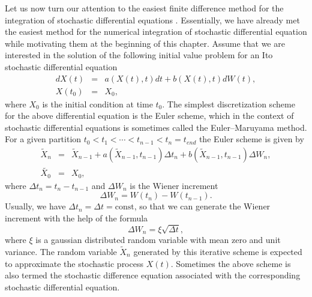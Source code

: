 Let us now turn our attention to the easiest finite difference 
method for the integration of stochastic differential equations
\cite{HONERKAMP,KLOEDEN_NUM,OETTINGER}.
Essentially, we have already met the easiest method for the 
numerical integration of stochastic differential equation while 
motivating them at the beginning of this chapter.
Assume that we are interested in the solution of the following
initial value problem for an Ito stochastic differential equation
\begin{eqnarray*}
dX(t) &=& a(X(t),t) dt + b(X(t),t) dW(t), \\
X(t_0) &=& X_0,
\end{eqnarray*}
where $X_0$ is the initial condition at time $t_0$. The simplest 
discretization scheme for the above differential equation
is the Euler scheme, which in the context of stochastic 
differential equations is sometimes called the Euler--Maruyama
method. For a given partition 
$t_0 < t_1 < \cdots < t_{n-1} < t_n=t_{end}$ 
the Euler scheme is given by
\begin{eqnarray*}
\tilde{X}_n &=& \tilde{X}_{n-1} +a (\tilde{X}_{n-1},t_{n-1}) \Delta 
t_n + b(\tilde{X}_{n-1},t_{n-1}) \Delta W_n, \\
\tilde{X_0} &=& X_0,
\end{eqnarray*}
where $\Delta t_n = t_n - t_{n-1}$ and $\Delta W_n$
is the Wiener increment
\begin{equation*}
\Delta W_n = W(t_n) - W(t_{n-1}).
\end{equation*}
Usually, we have $\Delta t_n = \Delta t = \text{const}$, so that
we can generate the Wiener increment with the help of the formula
\begin{equation*}
\Delta W_n = \xi \sqrt{\Delta t},
\end{equation*}
where $\xi$ is a gaussian distributed random variable with mean 
zero and unit variance. The random variable $\tilde{X}_n$ 
generated by this iterative scheme is expected to approximate the 
stochastic process $X(t)$. Sometimes the above scheme is also 
termed the stochastic difference equation associated with the 
corresponding stochastic differential equation.

